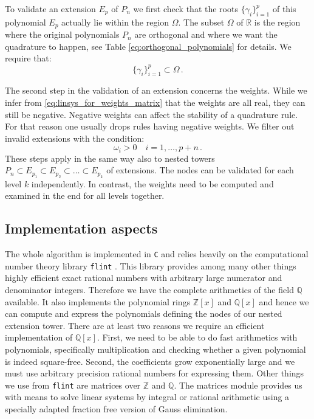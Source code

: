 \documentclass[a4paper,10pt]{article}
\begin{document}
To validate an extension $E_p$ of $P_n$ we first check that the roots $\{\gamma_i\}_{i=1}^p$ of
this polynomial $E_p$ actually lie within the region $\Omega$.
The subset $\Omega$ of $\mathbb{R}$ is the region where the original polynomials $P_n$ are orthogonal
and where we want the quadrature to happen, see Table \ref{eq:orthogonal_polynomials} for details.
We require that:
\begin{equation}
  \{\gamma_i\}_{i=1}^p \subset \Omega \,.
\end{equation}

The second step in the validation of an extension concerns the weights.
While we infer from \eqref{eq:linsys_for_weights_matrix} that the weights are all
real, they can still be negative. Negative weights can affect the stability
of a quadrature rule. For that reason one usually drops rules having negative
weights. We filter out invalid extensions with the condition:
\begin{equation}
  \omega_i > 0 \quad i=1, \ldots, p+n \,.
\end{equation}
These steps apply in the same way also to nested towers
$P_n \subset E_{p_1} \subset E_{p_2} \subset \ldots \subset E_{p_k}$
of extensions. The nodes can be validated for each level $k$ independently.
In contrast, the weights need to be computed and examined in the end for
all levels together.


\FloatBarrier
\subsection{Implementation aspects}
\label{sec:implementation_aspects}

The whole algorithm is implemented in \texttt{C} and relies heavily
on the computational number theory library \texttt{flint} \cite{flint, Hart2010}.
This library provides among many other things highly efficient exact rational
numbers with arbitrary large numerator and denominator integers. Therefore we
have the complete arithmetics of the field $\mathbb{Q}$ available. It also
implements the polynomial rings $\mathbb{Z}[x]$ and $\mathbb{Q}[x]$ and hence we
can compute and express the polynomials defining the nodes of our nested extension
tower. There are at least two reasons we require an efficient implementation of
$\mathbb{Q}[x]$. First, we need to be able to do fast arithmetics with polynomials,
specifically multiplication and checking whether a given polynomial is indeed square-free.
Second, the coefficients grow exponentially large and we must use arbitrary precision
rational numbers for expressing them. Other things we use from \texttt{flint} are
matrices over $\mathbb{Z}$ and $\mathbb{Q}$. The matrices module provides us with means
to solve linear systems by integral or rational arithmetic using a specially adapted
fraction free version of Gauss elimination.
\end{document}
